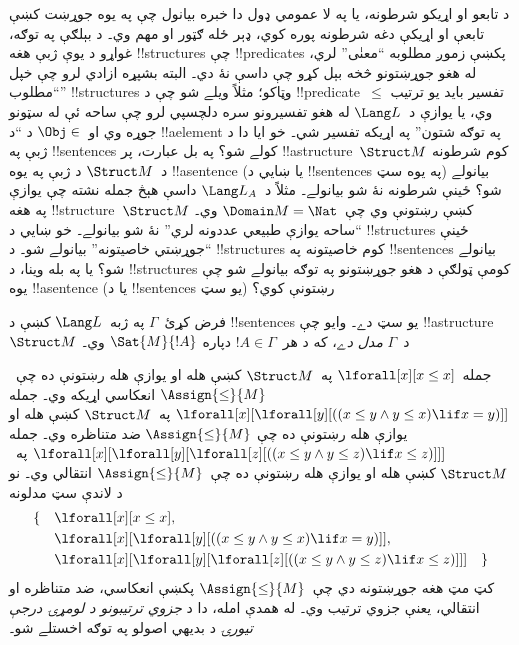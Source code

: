 \documentclass[../../../include/open-logic-section]{subfiles}
\begin{document}


\begin{explain}
د تابعو او اړيکو شرطونه، يا په لا عمومي ډول دا خبره بيانول چې په
يوه جوړښت کښې تابعې او اړيکې دغه شرطونه پوره کوي، ډېر ځله ګټور او
مهم وي۔ د بېلګې په توګه، غواړو د يوې ژبې هغه !!{structure}s چې
!!{predicate}s پکښې زموږ مطلوبه ``معنٰی'' لري، له هغو جوړښتونو څخه
بېل کړو چې داسې نۀ دي۔ البته بشپړه ازادي لرو چې خپل ``مطلوب''
!!{structure}s وټاکو؛ مثلاً ويلے شو چې د !!{predicate}~$\le$ تفسير بايد يو
ترتيب وي، يا يوازې د~$\Lang L$ له هغو تفسيرونو سره دلچسپي لرو چې
ساحه ئې له سټونو جوړه وي او~$\Obj \in$ د ``د !!a{element} په توګه
شتون'' په اړيکه تفسير شي۔ خو ايا دا د ژبې په !!{sentence}s کولے شو؟
په بل عبارت، پر !!a{structure}~$\Struct M$ کوم شرطونه د~$\Struct M$
د ژبې په يوه !!a{sentence} (يا ښايي د !!{sentence}s په يوه سټ)
بيانولے شو؟ ځينې شرطونه نۀ شو بيانولے۔ مثلاً د~$\Lang L_A$ داسې
هېڅ جمله نشته چې يوازې په هغه !!{structure}~$\Struct M$ کښې رښتونې
وي چې~$\Domain M = \Nat$ وي۔ ``ساحه يوازې طبيعي عددونه لري'' نۀ شو
بيانولے۔ خو ښايي د !!{structure}s ځينې ``جوړښتي خاصيتونه'' بيانولے
شو۔ د !!{structure}s کوم خاصيتونه په !!{sentence}s بيانولے شو؟ يا
په بله وينا، د !!{structure}s کومې ټولګې د هغو جوړښتونو په توګه
بيانولے شو چې يوه !!a{sentence} (يا د !!{sentence}s يو سټ) رښتونې
کوي؟
\end{explain}

\begin{defn}
فرض کړئ~$\Gamma$ په ژبه~$\Lang L$ کښې د !!{sentence}s يو سټ دے۔
وايو چې !!a{structure}~$\Struct M$ د~$\Gamma$ \emph{مدل دے}، که د
هر~$!A \in \Gamma$ دپاره $\Sat{M}{!A}$ وي۔
\end{defn}

\begin{ex}
جمله~$\lforall[x][x \le x]$ په~$\Struct M$ کښې هله او يوازې هله
رښتونې ده چې~$\Assign{\le}{M}$ انعکاسي اړيکه وي۔ جمله
$\lforall[x][\lforall[y][((x \le y \land y \le x) \lif x = y)]]$
په~$\Struct M$ کښې هله او يوازې هله رښتونې ده چې
$\Assign{\le}{M}$ ضد متناظره وي۔ جمله
$\lforall[x][\lforall[y][\lforall[z][((x \le y \land y \le z)
      \lif x \le z)]]]$ په~$\Struct M$ کښې هله او يوازې هله رښتونې
ده چې~$\Assign{\le}{M}$ انتقالي وي۔ نو د لاندې سټ مدلونه
\begin{align*}
\{\quad &\lforall[x][x \le x], \\
   & \lforall[x][\lforall[y][((x \le y \land y \le
    x) \lif x = y)]], \\
   &\lforall[x][\lforall[y][\lforall[z][((x \le y
      \land y \le z) \lif x \le z)]]] \quad \}
\end{align*}
کټ مټ هغه جوړښتونه دي چې~$\Assign{\le}{M}$ پکښې انعکاسي، ضد
متناظره او انتقالي، يعنې جزوي ترتيب وي۔ له همدې امله، دا د
\emph{جزوي ترتيبونو د لومړۍ درجې تيورۍ} د بديهي اصولو په توګه
اخستلے شو۔
\end{ex}
\end{document}
